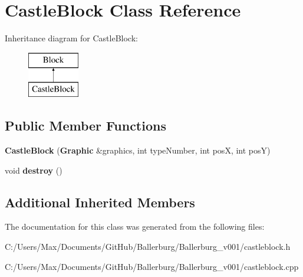 \section{Castle\+Block Class Reference}
\label{class_castle_block}
Inheritance diagram for Castle\+Block\+:\begin{figure}[H]
\begin{center}
\leavevmode
\includegraphics[height=2.000000cm]{class_castle_block}
\end{center}
\end{figure}
\subsection*{Public Member Functions}
\begin{DoxyCompactItemize}
\item 
{\bfseries Castle\+Block} ({\bf Graphic} \&graphics, int type\+Number, int pos\+X, int pos\+Y)\label{class_castle_block_a671cb6316ce4692c603c3c5fac39dbf5}

\item 
void {\bfseries destroy} ()\label{class_castle_block_af3bdbe064632c9b75a1139a97ae04748}

\end{DoxyCompactItemize}
\subsection*{Additional Inherited Members}


The documentation for this class was generated from the following files\+:\begin{DoxyCompactItemize}
\item 
C\+:/\+Users/\+Max/\+Documents/\+Git\+Hub/\+Ballerburg/\+Ballerburg\+\_\+v001/castleblock.\+h\item 
C\+:/\+Users/\+Max/\+Documents/\+Git\+Hub/\+Ballerburg/\+Ballerburg\+\_\+v001/castleblock.\+cpp\end{DoxyCompactItemize}
